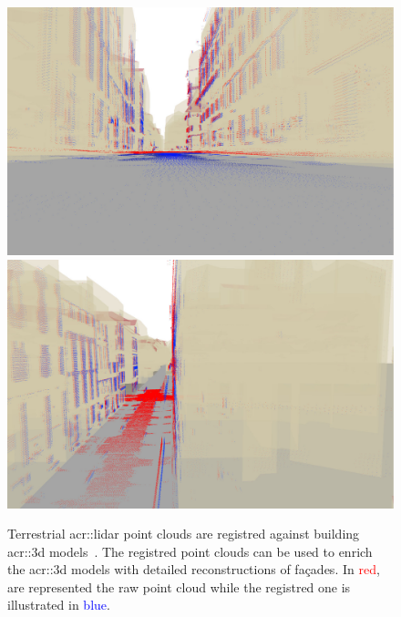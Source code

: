             \begin{figure}[htpb]
                \centering
                \includegraphics[width=.45\textwidth]{images/introduction/registration_1}
                \includegraphics[width=.45\textwidth]{images/introduction/registration_2}
                \caption{
                    \label{fig::3d_model_terrestrial_registration} Terrestrial \gls{acr::lidar} point clouds are registred against building \gls{acr::3d} models~\parencite{monnier2014}.
                    The registred point clouds can be used to enrich the \gls{acr::3d} models with detailed reconstructions of fa\c{c}ades.
                    In \textcolor{Red}{red}, are represented the raw point cloud while the registred one is illustrated in \textcolor{Blue}{blue}.
                }
            \end{figure}

